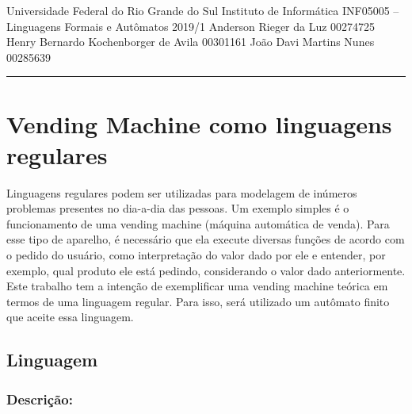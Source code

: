 \documentclass{article}
\begin{document}
\noindent
Universidade Federal do Rio Grande do Sul \hfill Instituto de Inform\'atica \newline
INF05005 -- Linguagens Formais e Aut\^omatos \hfill 2019/1 \newline
Anderson Rieger da Luz \hfill 00274725 \newline
Henry Bernardo Kochenborger de Avila \hfill 00301161 \newline
João Davi Martins Nunes \hfill 00285639
\rule{\linewidth}{1.pt}

\section*{Vending Machine como linguagens regulares}

\par
  Linguagens regulares podem ser utilizadas para modelagem de in\'umeros problemas presentes no dia-a-dia das pessoas. Um exemplo simples é o funcionamento de uma vending machine (m\'aquina autom\'atica de venda). Para esse tipo de aparelho, \'e necess\'ario que ela execute diversas fun\c{c}\~oes de acordo com o pedido do usu\'ario, como interpreta\c{c}\~ao do valor dado por ele e entender, por exemplo, qual produto ele est\'a pedindo, considerando o valor dado anteriormente. \newline
  Este trabalho tem a inten\c{c}\~ao de exemplificar uma vending machine te\'orica em termos de uma linguagem regular. Para isso, ser\'a utilizado um aut\^omato finito que aceite essa linguagem.

\subsection*{\centering Linguagem}

\subsubsection*{Descri\c{c}\~ao:}
\end{document}
